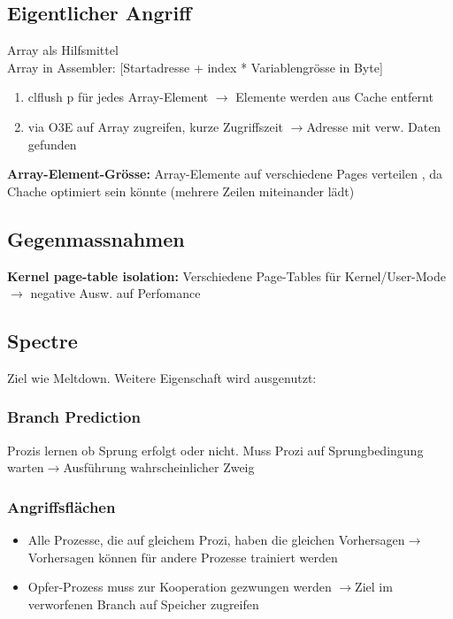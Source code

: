 \subsection{Eigentlicher Angriff}
Array als Hilfsmittel\\
Array in Assembler: [Startadresse + index * Variablengrösse in Byte]
\begin{enumerate}
    \item clflush p für jedes Array-Element $\rightarrow$ Elemente werden aus Cache entfernt
    \item via O3E auf Array zugreifen, kurze Zugriffszeit $\rightarrow$Adresse mit verw. Daten gefunden
\end{enumerate}
\textbf{Array-Element-Grösse: }Array-Elemente auf verschiedene Pages verteilen , da Chache optimiert sein könnte (mehrere Zeilen miteinander lädt)

\subsection{Gegenmassnahmen}
\textbf{Kernel page-table isolation: }Verschiedene Page-Tables für Kernel/User-Mode $\rightarrow$ negative Ausw. auf Perfomance

\subsection{Spectre}
Ziel wie Meltdown. Weitere Eigenschaft wird ausgenutzt:
\subsubsection{Branch Prediction}
Prozis lernen ob Sprung erfolgt oder nicht. Muss Prozi auf Sprungbedingung warten$\rightarrow$Ausführung wahrscheinlicher Zweig

\subsubsection{Angriffsflächen}
\begin{itemize}
    \item Alle Prozesse, die auf gleichem Prozi, haben die gleichen Vorhersagen$\rightarrow$Vorhersagen können für andere Prozesse trainiert werden
    \item Opfer-Prozess muss zur Kooperation gezwungen werden $\rightarrow$Ziel im verworfenen Branch auf Speicher zugreifen
\end{itemize}







